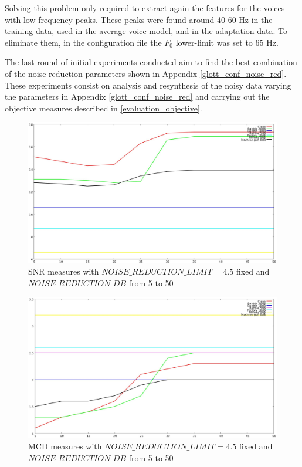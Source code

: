 Solving this problem only required to extract again the features for the voices with low-frequency peaks.
%
These peaks were found around 40-60 Hz in the training data, used in the average voice model, and in the adaptation data.
%
To eliminate them, in the configuration file the $F_{0}$ lower-limit was set to 65 Hz.

The last round of initial experiments conducted aim to find the best combination of the noise reduction parameters shown in Appendix \ref{glott_conf_noise_red}.
%
These experiments consist on analysis and resynthesis of the noisy data varying the parameters in Appendix \ref{glott_conf_noise_red} and carrying out the objective measures described in \ref{evaluation_objective}.
%

\begin{figure}[!htb]
\begin{centering}
\includegraphics[width=\textwidth]{images/noise_red_snr_exp.jpg}
\caption{SNR measures with $NOISE\_REDUCTION\_LIMIT = 4.5$ fixed and $NOISE\_REDUCTION\_DB$ from 5 to 50}
\label{fig:noise_red_snr}
\end{centering}
\end{figure}

\begin{figure}[!htb]
\begin{centering}
\includegraphics[width=\textwidth]{images/noise_red_mcd_exp.jpg}
\caption{MCD measures with $NOISE\_REDUCTION\_LIMIT = 4.5$ fixed and $NOISE\_REDUCTION\_DB$ from 5 to 50}
\label{fig:noise_red_mcd}
\end{centering}
\end{figure}

